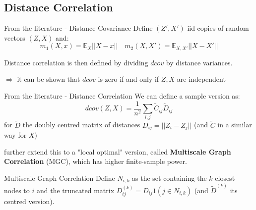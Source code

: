 \documentclass[10.5pt]{beamer}
\begin{document}
\subsection{Distance Correlation}

\begin{frame}{From the literature - Distance Covariance}
Define $(Z', X')$ iid copies of random vectors $(Z, X)$ and:
\[
m_1(X, x) =\mathbb{E}_{X}||X-x|| \quad m_2(X, X') = \mathbb{E}_{X, X'}||X-X'||
\]

Distance correlation is then defined by dividing $dcov$ by distance variances.

$\Rightarrow$ it can be shown that $dcov$ is zero if and only if $Z, X$ are independent 
\end{frame}

\begin{frame}{From the literature - Distance Correlation}
We can define a sample version as:
\[
dcov(Z, X) = \frac{1}{n^{2}}\sum_{i,j}\tilde{C}_{ij}\tilde{D}_{ij}
\]
for $\tilde{D}$ the doubly centred matrix of distances $D_{ij}=||Z_i - Z_j||$ (and $\tilde{C}$ in a similar way for $X$)
\vspace{.5em}

\citet{shen_distance_2020} further extend this to a "local optimal" version, called \textbf{Multiscale Graph Correlation} (MGC), which has higher finite-sample power. 

\end{frame}

\begin{frame}{Multiscale Graph Correlation}
Define $N_{i, k}$ as the set containing the $k$ closest nodes to $i$ and the truncated matrix $D_{ij}^{(k)}=D_{ij}1(j \in N_{i, k})$ (and $\tilde{D}^{(k)}$ its centred version).
\end{frame}
\end{document}
